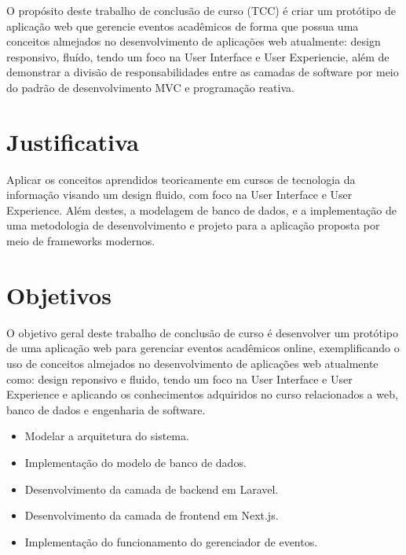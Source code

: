 O propósito deste trabalho de conclusão de curso (TCC) é criar um protótipo de aplicação web que gerencie eventos acadêmicos de forma que possua uma conceitos almejados no desenvolvimento de aplicações web atualmente: design responsivo, fluído, tendo um foco na User Interface e User Experiencie, além de demonstrar a divisão de responsabilidades entre as camadas de software por meio do padrão de desenvolvimento MVC e programação reativa.


\section{Justificativa}

Aplicar os conceitos aprendidos teoricamente em cursos de tecnologia da informação  visando um design fluido, com foco na User Interface e User Experience. Além destes, a modelagem de banco de dados, e a implementação de uma metodologia de desenvolvimento e projeto para a aplicação proposta por meio de frameworks modernos.


\section{Objetivos}
O objetivo geral deste trabalho de conclusão de curso é desenvolver um protótipo de uma aplicação web para gerenciar eventos acadêmicos online, exemplificando o uso de conceitos almejados no desenvolvimento de aplicações web atualmente como: design reponsivo e fluido, tendo um foco na User Interface e User Experience e aplicando os conhecimentos adquiridos no curso relacionados a web, banco de dados e engenharia de software.

\begin{itemize}
    \item Modelar a arquitetura do sistema.
    \item Implementação do modelo de banco de dados.
    \item Desenvolvimento da camada de backend em Laravel.
    \item Desenvolvimento da camada de frontend em Next.js.
    \item Implementação do funcionamento do gerenciador de eventos.
\end{itemize}


